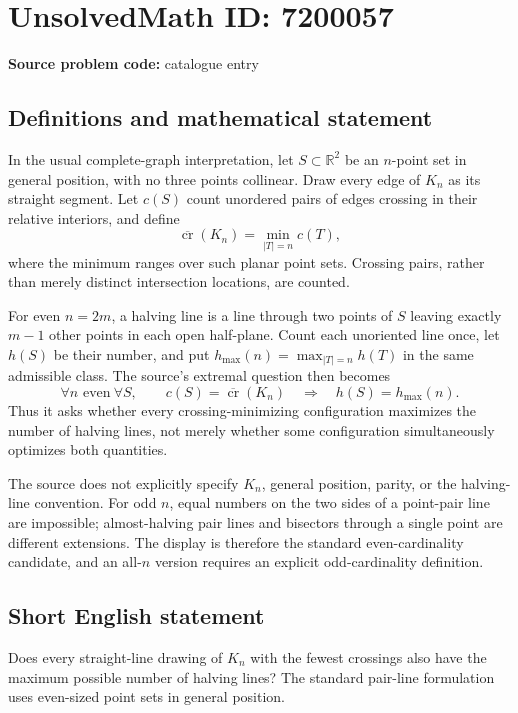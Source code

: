 \documentclass[11pt]{article}
\newcommand{\R}{\mathbb{R}}
\begin{document}
\section*{UnsolvedMath ID: 7200057}
\textbf{Source problem code:} catalogue entry
\subsection{Definitions and mathematical statement}
In the usual complete-graph interpretation, let $S\subset\R^2$ be an $n$-point set in general position, with no three points collinear. Draw every edge of $K_n$ as its straight segment. Let $c(S)$ count unordered pairs of edges crossing in their relative interiors, and define
\[
\overline{\operatorname{cr}}(K_n)=\min_{|T|=n}c(T),
\]
where the minimum ranges over such planar point sets. Crossing pairs, rather than merely distinct intersection locations, are counted.

For even $n=2m$, a halving line is a line through two points of $S$ leaving exactly $m-1$ other points in each open half-plane. Count each unoriented line once, let $h(S)$ be their number, and put $h_{\max}(n)=\max_{|T|=n}h(T)$ in the same admissible class. The source's extremal question then becomes
\[
\forall n\text{ even}\ \forall S,\qquad
c(S)=\overline{\operatorname{cr}}(K_n)\quad\Longrightarrow\quad h(S)=h_{\max}(n).
\]
Thus it asks whether every crossing-minimizing configuration maximizes the number of halving lines, not merely whether some configuration simultaneously optimizes both quantities.

The source does not explicitly specify $K_n$, general position, parity, or the halving-line convention. For odd $n$, equal numbers on the two sides of a point-pair line are impossible; almost-halving pair lines and bisectors through a single point are different extensions. The display is therefore the standard even-cardinality candidate, and an all-$n$ version requires an explicit odd-cardinality definition.
\subsection{Short English statement}
Does every straight-line drawing of $K_n$ with the fewest crossings also have the maximum possible number of halving lines? The standard pair-line formulation uses even-sized point sets in general position.
\end{document}
